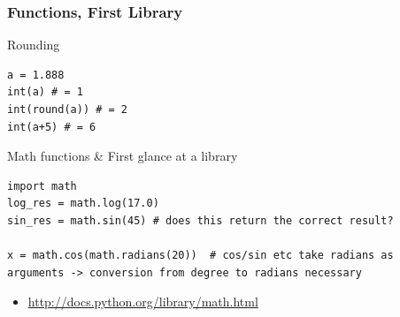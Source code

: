 \documentclass[10pt, a4paper]{beamer} %
\begin{document}
\begin{frame}[c, fragile]\frametitle{Functions, First Library}
  \begin{block}{Rounding}
    \begin{lstlisting}
a = 1.888
int(a) # = 1
int(round(a)) # = 2
int(a+5) # = 6
    \end{lstlisting}
  \end{block}
  \begin{block}{Math functions \& First glance at a library}
    \begin{lstlisting}
import math
log_res = math.log(17.0)
sin_res = math.sin(45) # does this return the correct result?

x = math.cos(math.radians(20))  # cos/sin etc take radians as arguments -> conversion from degree to radians necessary
  \end{lstlisting}
    \begin{itemize}
      \item \tiny \url{http://docs.python.org/library/math.html}
    \end{itemize}
  \end{block}
\end{frame}
\end{document}
